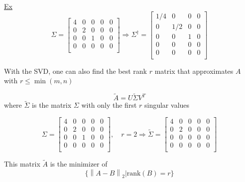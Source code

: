 \underline{Ex}
\begin{equation*}
  \Sigma =
  \begin{bmatrix}
    4 & 0 & 0 & 0 & 0 \\
    0 & 2 & 0 & 0 & 0 \\
    0 & 0 & 1 & 0 & 0 \\
    0 & 0 & 0 & 0 & 0 \\
  \end{bmatrix} \Rightarrow
  \Sigma^\dagger =
  \begin{bmatrix}
    1/4 & 0   & 0 & 0  \\
    0   & 1/2 & 0 & 0  \\
    0   & 0   & 1 & 0  \\
    0   & 0   & 0 & 0  \\
    0   & 0   & 0 & 0  \\
  \end{bmatrix}
\end{equation*}

With the SVD, one can also find the best rank $r$ matrix that approximates $A$ with $r\leq \min(m,n)$

\begin{equation*}
\widetilde{A} = U \widetilde{\Sigma} V^T
\end{equation*}
where $\widetilde{\Sigma}$ is the matrix $\Sigma$ with only the first $r$ singular values

\begin{equation*}
    \Sigma =
    \begin{bmatrix}
        4 & 0 & 0 & 0 & 0 \\
        0 & 2 & 0 & 0 & 0 \\
        0 & 0 & 1 & 0 & 0 \\
        0 & 0 & 0 & 0 & 0 \\
    \end{bmatrix}
    , \quad r=2 \Rightarrow
    \widetilde{\Sigma} =
    \begin{bmatrix}
        4 & 0 & 0 & 0 & 0 \\
        0 & 2 & 0 & 0 & 0 \\
        0 & 0 & 0 & 0 & 0 \\
        0 & 0 & 0 & 0 & 0 \\
    \end{bmatrix}
\end{equation*}

This matrix $\widetilde{A}$ is the minimizer of
\begin{equation*}
    \big\{ \left\lVert A-B\right\rVert_2  | \text{rank}(B) = r \big\}
\end{equation*}

